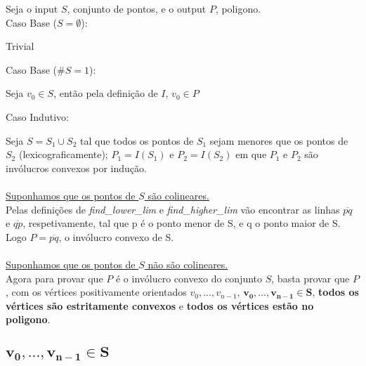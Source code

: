\documentclass[11pt]{article}
\begin{document}
Seja o input $S$, conjunto de pontos, e o output $P$, poligono.\\
Caso Base ($S = \emptyset$):\par
\hfill\begin{minipage}{\dimexpr\textwidth-1cm}
    Trivial\\
\end{minipage}
Caso Base ($\#S = 1$):\par
\hfill\begin{minipage}{\dimexpr\textwidth-1cm}
    Seja $v_0 \in S$, então pela definição de $I$, $v_0 \in P$\\
\end{minipage}
Caso Indutivo:\par
\hfill\begin{minipage}{\dimexpr\textwidth-1cm}
    Seja $S = S_1 \cup S_2$ tal que todos os pontos de $S_1$
    sejam menores que os pontos de $S_2$ (lexicograficamente); 
    $P_1 = I(S_1)$ e $P_2 = I(S_2)$ em que $P_1$ e $P_2$ são 
    invólucros convexos por indução.\\\\
    
    \underline{Suponhamos que os pontos de $S$ são colineares.}\\
    Pelas definições de \textit{find\_lower\_lim} e 
    \textit{find\_higher\_lim} vão encontrar as linhas 
    $\overline{p q}$ e $\overline{q p}$, respetivamente,
    tal que p é o ponto menor de S, e q o ponto maior de S. 
    Logo $P = \overline{p q}$, o invólucro convexo de S.\\\\

    \underline{Suponhamos que os pontos de $S$ não são colineares.}\\
    Agora para provar que $P$ é o invólucro convexo
    do conjunto $S$, basta provar que $P$, com os vértices 
    positivamente orientados $v_0,...,v_{n-1}$, $\mathbf{v_0,...,v_{n-1} \in S}$, 
    \textbf{todos os vértices são estritamente convexos} e 
    \textbf{todos os vértices estão no poligono}.\\
    
    
    
\end{minipage}

\subsection{$\mathbf{v_0,...,v_{n-1} \in S}$}
\end{document}
